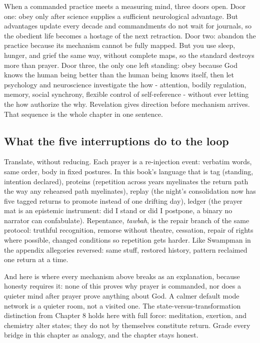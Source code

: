 When a commanded practice meets a measuring mind, three doors open. Door one: obey only after science supplies a sufficient neurological advantage. But advantages update every decade and commandments do not wait for journals, so the obedient life becomes a hostage of the next retraction. Door two: abandon the practice because its mechanism cannot be fully mapped. But you use sleep, hunger, and grief the same way, without complete maps, so the standard destroys more than prayer. Door three, the only one left standing: obey because God knows the human being better than the human being knows itself, then let psychology and neuroscience investigate the how - attention, bodily regulation, memory, social synchrony, flexible control of self-reference - without ever letting the how authorize the why. Revelation gives direction before mechanism arrives. That sequence is the whole chapter in one sentence.

\subsection*{What the five interruptions do to the loop}

Translate, without reducing. Each prayer is a re-injection event: verbatim words, same order, body in fixed postures. In this book's language that is tag (standing, intention declared), proteins (repetition across years myelinates the return path the way any rehearsed path myelinates), replay (the night's consolidation now has five tagged returns to promote instead of one drifting day), ledger (the prayer mat is an epistemic instrument: did I stand or did I postpone, a binary no narrator can confabulate). Repentance, \textit{tawbah}, is the repair branch of the same protocol: truthful recognition, remorse without theatre, cessation, repair of rights where possible, changed conditions so repetition gets harder. Like Swampman in the appendix allegories reversed: same stuff, restored history, pattern reclaimed one return at a time.

And here is where every mechanism above breaks as an explanation, because honesty requires it: none of this proves why prayer is commanded, nor does a quieter mind after prayer prove anything about God. A calmer default mode network is a quieter room, not a visited one. The state-versus-transformation distinction from Chapter 8 holds here with full force: meditation, exertion, and chemistry alter states; they do not by themselves constitute return. Grade every bridge in this chapter as analogy, and the chapter stays honest.

